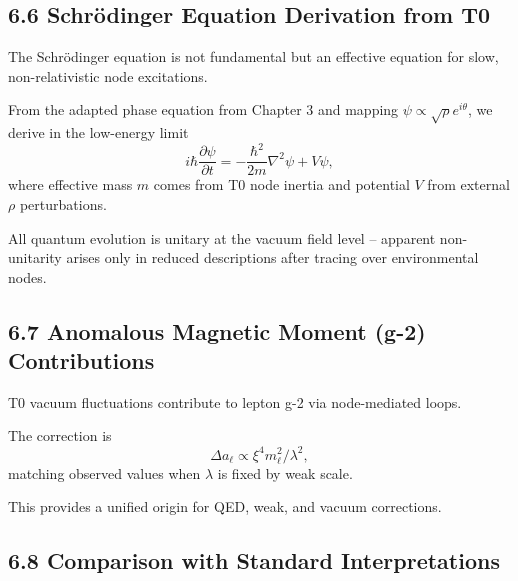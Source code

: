 	\subsection{6.6 Schrödinger Equation Derivation from T0}
	
	The Schrödinger equation is not fundamental but an effective equation for slow, non-relativistic node excitations.
	
	From the adapted phase equation from Chapter 3 and mapping $\psi \propto \sqrt{\rho} e^{i\theta}$, we derive in the low-energy limit
	\[
	i \hbar \frac{\partial \psi}{\partial t} = -\frac{\hbar^2}{2m} \nabla^2 \psi + V \psi,
	\]
	where effective mass $m$ comes from T0 node inertia and potential $V$ from external $\rho$ perturbations.
	
	All quantum evolution is unitary at the vacuum field level – apparent non-unitarity arises only in reduced descriptions after tracing over environmental nodes.
	
	\subsection{6.7 Anomalous Magnetic Moment (g-2) Contributions}
	
	T0 vacuum fluctuations contribute to lepton g-2 via node-mediated loops.
	
	The correction is
	\[
	\Delta a_\ell \propto \xi^4 m_\ell^2 / \lambda^2,
	\]
	matching observed values when $\lambda$ is fixed by weak scale.
	
	This provides a unified origin for QED, weak, and vacuum corrections.
	
	\subsection{6.8 Comparison with Standard Interpretations}
	
	\begin{table}[htbp]
		\centering
		\caption{Quantum interpretation comparison}
		\label{tab:quantum}
	\end{table}
	

